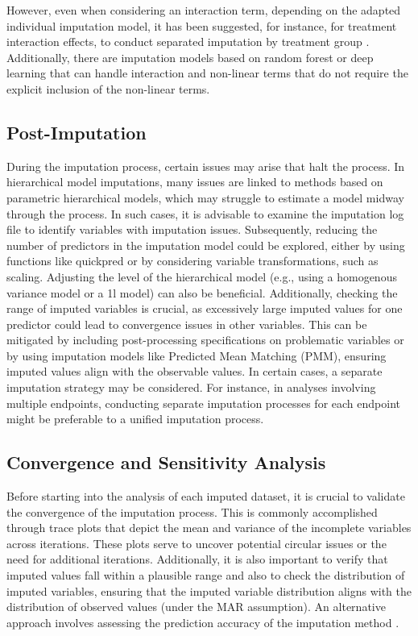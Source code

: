 \documentclass[
  article]{jss}
\begin{document}
However, even when considering an interaction term, depending on the
adapted individual imputation model, it has been suggested, for
instance, for treatment interaction effects, to conduct separated
imputation by treatment group \cite{zhang2023}. Additionally, there are
imputation models based on random forest or deep learning that can
handle interaction and non-linear terms that do not require the explicit
inclusion of the non-linear terms.

\hypertarget{post-imputation}{%
\subsection{Post-Imputation}\label{post-imputation}}

During the imputation process, certain issues may arise that halt the
process. In hierarchical model imputations, many issues are linked to
methods based on parametric hierarchical models, which may struggle to
estimate a model midway through the process. In such cases, it is
advisable to examine the imputation log file to identify variables with
imputation issues. Subsequently, reducing the number of predictors in
the imputation model could be explored, either by using functions like
quickpred or by considering variable transformations, such as scaling.
Adjusting the level of the hierarchical model (e.g., using a homogenous
variance model or a 1l model) can also be beneficial. Additionally,
checking the range of imputed variables is crucial, as excessively large
imputed values for one predictor could lead to convergence issues in
other variables. This can be mitigated by including post-processing
specifications on problematic variables or by using imputation models
like Predicted Mean Matching (PMM), ensuring imputed values align with
the observable values. In certain cases, a separate imputation strategy
may be considered. For instance, in analyses involving multiple
endpoints, conducting separate imputation processes for each endpoint
might be preferable to a unified imputation process.

\hypertarget{convergence-and-sensitivity-analysis}{%
\subsection{Convergence and Sensitivity
Analysis}\label{convergence-and-sensitivity-analysis}}

Before starting into the analysis of each imputed dataset, it is crucial
to validate the convergence of the imputation process. This is commonly
accomplished through trace plots that depict the mean and variance of
the incomplete variables across iterations. These plots serve to uncover
potential circular issues or the need for additional iterations.
Additionally, it is also important to verify that imputed values fall
within a plausible range and also to check the distribution of imputed
variables, ensuring that the imputed variable distribution aligns with
the distribution of observed values (under the MAR assumption). An
alternative approach involves assessing the prediction accuracy of the
imputation method \cite{cai2023}.
\end{document}
